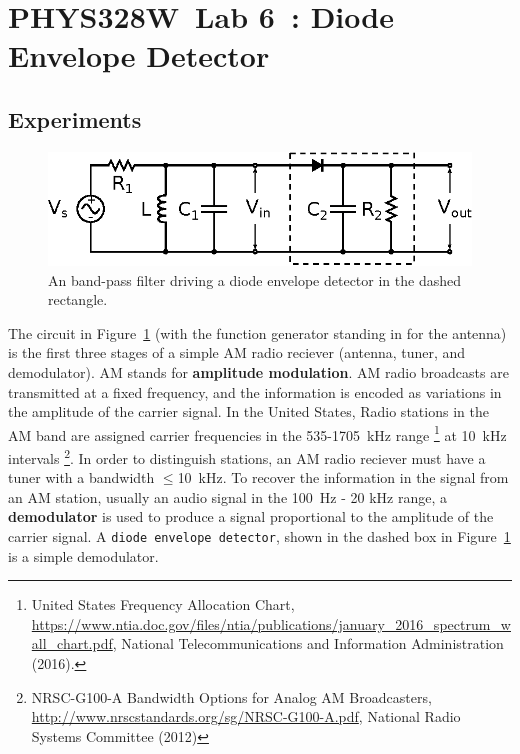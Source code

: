 \documentclass[11pt]{article}
\newcommand{\COURSE}{PHYS328W}
\newcommand{\LABNUM}{6}
\newcommand{\TITLE}{Diode Envelope Detector}
\begin{document}
\thispagestyle{empty}

\section*{\COURSE\ Lab \LABNUM\ : \TITLE}

\subsection*{Experiments}

\begin{figure}[h]
\centering
\includegraphics{demodulator.eps}
\caption{An band-pass filter driving a diode envelope
  detector in the dashed rectangle.}
\label{fig:demodulator}
\end{figure}

The circuit in Figure~\ref{fig:demodulator} (with the function
generator standing in for the antenna) is the first three stages of a
simple AM radio reciever (antenna, tuner, and demodulator). AM stands
for \textbf{amplitude modulation}. AM radio broadcasts are transmitted
at a fixed frequency, and the information is encoded as variations in
the amplitude of the carrier signal. In the United States, Radio
stations in the AM band are assigned carrier frequencies in the
535-1705~kHz range
\footnote{United States Frequency Allocation Chart,
  \url{https://www.ntia.doc.gov/files/ntia/publications/january_2016_spectrum_wall_chart.pdf},
  National Telecommunications and Information Administration
  (2016).}
at 10~kHz intervals
\footnote{NRSC-G100-A Bandwidth Options for Analog AM Broadcasters,
  \url{http://www.nrscstandards.org/sg/NRSC-G100-A.pdf},
  National Radio Systems Committee (2012)}.
In order to distinguish stations, an AM 
radio reciever must have a tuner with a bandwidth $\leq$10~kHz.  To
recover the information in the signal from an AM station, usually an
audio signal in the 100~Hz - 20 kHz range, a \textbf{demodulator} is
used to produce a signal proportional to the amplitude of the carrier
signal. A \texttt{diode envelope detector}, shown in the dashed box in
Figure~\ref{fig:demodulator} is a simple demodulator.
\end{document}
